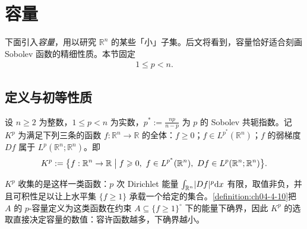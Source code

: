 \documentclass[../../main.tex]{subfiles}%
\begin{document}
\section{容量}\label{section:ch04-07}

下面引入\emph{容量}，用以研究 $\mathbb{R}^n$ 的某些「小」子集。后文将看到，容量恰好适合刻画 Sobolev 函数的精细性质。本节固定
\begin{align*}
1\leqslant p<n .
\end{align*}

\subsection{定义与初等性质}\label{subsection:ch04-07-1}

\begin{definition}\label{definition:ch04-4-9}
设 $n\geqslant2$ 为整数，$1\leqslant p<n$ 为实数，$p^*:=\frac{np}{n-p}$ 为 $p$ 的 Sobolev 共轭指数。记 $K^p$ 为满足下列三条的函数 $f:\mathbb{R}^n\to\mathbb{R}$ 的全体：$f\geqslant0$；$f\in L^{p^*}(\mathbb{R}^n)$；$f$ 的弱梯度 $Df$ 属于 $L^p(\mathbb{R}^n;\mathbb{R}^n)$。即
\begin{align*}
K^p:=\bigl\{f:\mathbb{R}^n\to\mathbb{R}\bigm|f\geqslant0,\ f\in L^{p^*}(\mathbb{R}^n),\ Df\in L^p(\mathbb{R}^n;\mathbb{R}^n)\bigr\}.
\end{align*}
\end{definition}

\begin{remark}\label{remark:ch04-def-4-9-动机}
$K^p$ 收集的是这样一类函数：$p$ 次 Dirichlet 能量 $\int_{\mathbb{R}^n}\lvert Df\rvert^p\mathrm{d} x$ 有限，取值非负，并且可积性足以让上水平集 $\{f\geqslant1\}$ 承载一个给定的集合。\cref{definition:ch04-4-10}把 $A$ 的 $p$-容量定义为这类函数在约束 $A\subseteq\{f\geqslant1\}^{\circ}$ 下的能量下确界，因此 $K^p$ 的选取直接决定容量的数值：容许函数越多，下确界越小。%
\end{remark}
\end{document}
